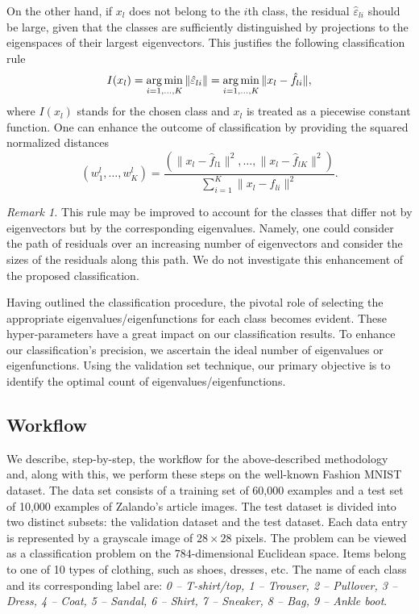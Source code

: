 On the other hand, if $x_l$ does not belong to the $i$th class, the residual $\hat\varepsilon_{li}$ should be large, given that the classes are sufficiently distinguished by projections to the eigenspaces of their largest eigenvectors.   
This justifies the following classification rule 
\begin{equation}
    \label{eq:class}
    I(x_l)=\mathop{\rm arg\, min}_{i=1,\dots,K}\|\hat \varepsilon_{li}\|=\mathop{\rm arg\, min}_{i=1,\dots,K}\|x_l -\hat f_{li}\|,
\end{equation}
where $I(x_l)$ stands for the chosen class and $x_l$ is treated as a piecewise constant function. 
One can enhance the outcome of classification by providing the squared normalized distances
\begin{equation}\label{eq:weights}
\left(w_1^l,\dots, w_K^l\right)=\frac{\left(\|x_l -\hat f_{l1}\|^2,\dots, \|x_l-\hat f_{lK}\|^2\right)}{\sum_{i=1}^K \|x_l-\hat f_{li}\|^2}.
\end{equation}

\noindent\emph{Remark 1.}
This rule may be improved to account for the classes that differ not by eigenvectors but by the corresponding eigenvalues. 
Namely, one could consider the path of residuals over an increasing number of eigenvectors and consider the sizes of the residuals along this path. 
We do not investigate this enhancement of the proposed classification.

Having outlined the classification procedure, the pivotal role of selecting the appropriate eigenvalues/eigenfunctions for each class becomes evident. These hyper-parameters have a great impact on our classification results.
To enhance our classification's precision, we ascertain the ideal number of eigenvalues or eigenfunctions. Using the validation set technique, our primary objective is to identify the optimal count of eigenvalues/eigenfunctions. 

\vspace{-.13cm}
\subsection{Workflow}\vspace{-.22cm}
We describe, step-by-step, the workflow for the above-described methodology and, along with this, we perform these steps on the well-known Fashion MNIST dataset. The data set consists of a training set of 60,000 examples and a test set of 10,000 examples of Zalando's article images. The test dataset is divided into two distinct subsets: the validation dataset and the test dataset. Each data entry is represented by a grayscale image of $28 \times 28$ pixels. 
 The problem can be viewed as a classification problem on the $784$-dimensional Euclidean space.
Items belong to one of 10 types of clothing, such as shoes, dresses, etc. The name of each class and its corresponding label are: \emph{0 -- T-shirt/top, 1 -- Trouser, 2 -- Pullover, 3 -- Dress, 4 -- Coat, 5 -- Sandal, 6 -- Shirt, 7 -- Sneaker, 8 -- Bag, 9 -- Ankle boot}.

